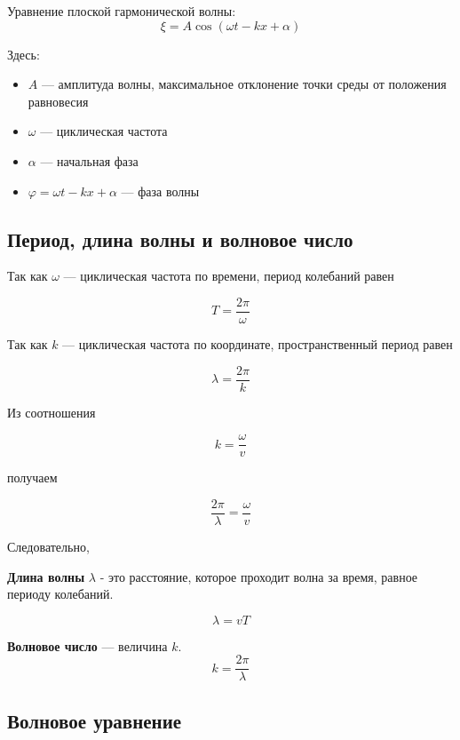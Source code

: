 \documentclass[a4paper,12pt]{article}
\begin{document}
\begin{theorembox}
Уравнение плоской гармонической волны:
\[
\xi = A \cos(\omega t - kx + \alpha)
\]
\end{theorembox}

Здесь:

\begin{itemize}
\item \(A\) — амплитуда волны, максимальное отклонение точки среды от положения равновесия
\item \(\omega\) — циклическая частота
\item \(\alpha\) — начальная фаза
\item \(\varphi = \omega t - kx + \alpha\) — фаза волны
\end{itemize}

\subsection*{Период, длина волны и волновое число}

Так как \(\omega\) — циклическая частота по времени, период колебаний равен

\[
T = \frac{2\pi}{\omega}
\]

Так как \(k\) — циклическая частота по координате, пространственный период равен

\[
\lambda = \frac{2\pi}{k}
\]

Из соотношения

\[
k = \frac{\omega}{v}
\]

получаем

\[
\frac{2\pi}{\lambda} = \frac{\omega}{v}
\]

Следовательно,


\begin{definitionbox}
\textbf{Длина волны} \(\lambda\) - это расстояние, которое проходит волна за время, равное периоду колебаний.

\[
\lambda = vT
\]
\end{definitionbox}



\begin{definitionbox}
\textbf{Волновое число} — величина \(k\).
\[
k = \frac{2\pi}{\lambda}
\]
\end{definitionbox}

\subsection*{Волновое уравнение}
\end{document}
